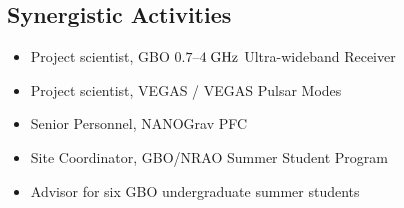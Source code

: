 \documentclass[10pt]{NSF}
\begin{document}
\subsection*{\normalsize Synergistic Activities}
\vspace{-0.5em}

\begin{itemize}
\item{Project scientist, GBO $0.7$--$4\; \textrm{GHz}$ Ultra-wideband
  Receiver}
\item{Project scientist, VEGAS / VEGAS Pulsar Modes}
\item{Senior Personnel, NANOGrav PFC}
\item{Site Coordinator, GBO/NRAO Summer Student Program}
\item{Advisor for six GBO undergraduate summer students}
\end{itemize}
\end{document}
